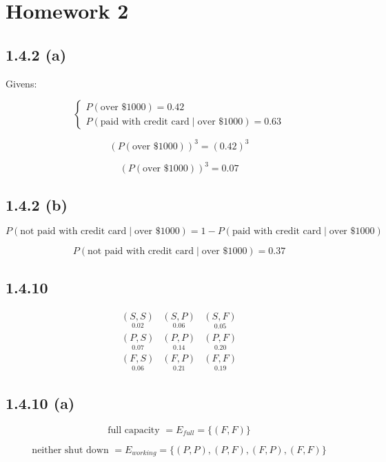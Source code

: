 \documentclass{article}
\begin{document}
\section*{Homework 2}


\subsection*{1.4.2 (a)}

Givens:

\[
\begin{cases}
P(\text{over \$1000}) = 0.42 \\
P\left(\text{paid with credit card}\mid\text{over \$1000}\right) = 0.63
\end{cases}
\]

\[
(P(\text{over \$1000}))^3 = (0.42)^3
\]

\[
\boxed{(P(\text{over \$1000}))^3 = 0.07}
\]

\subsection*{1.4.2 (b)}

\[
P\left(\text{not paid with credit card}\mid\text{over \$1000}\right) =
1 - P\left(\text{paid with credit card}\mid\text{over \$1000}\right)
\]

\[
\boxed{P\left(\text{not paid with credit card}\mid\text{over \$1000}\right) = 0.37}
\]

\subsection*{1.4.10}

\[
\begin{array}{ccc}
\underset{0.02}{(S, S)} & \underset{0.06}{(S, P)} & \underset{0.05}{(S, F)} \\
\underset{0.07}{(P, S)} & \underset{0.14}{(P, P)} & \underset{0.20}{(P, F)} \\
\underset{0.06}{(F, S)} & \underset{0.21}{(F, P)} & \underset{0.19}{(F, F)}
\end{array}
\]

\subsection*{1.4.10 (a)}

\[
\text{full capacity } = E_{full} = \{(F, F)\}
\]

\[
\text{neither shut down } = E_{working} = \{(P, P), (P, F), (F, P), (F, F)\}
\]
\end{document}
